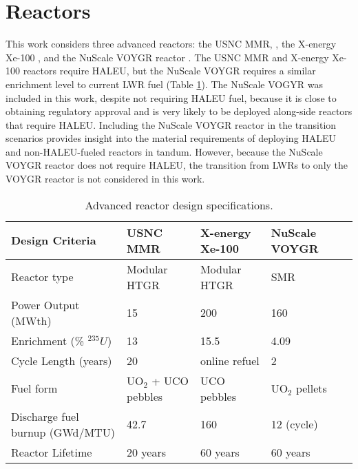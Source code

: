 \section{Reactors} \label{sec:reactor_methods}
This work considers three advanced reactors: the \gls{USNC} \gls{MMR}, 
\cite{mitchell_usnc_2020}, the X-energy Xe-100 
\cite{harlan_x-energy_2018,hussain_advances_2018}, and the NuScale VOYGR reactor
\cite{nuscale_chapter_2020,nuscale_chapter_2020-1}. The \gls{USNC} \gls{MMR}
and X-energy Xe-100 reactors require \gls{HALEU}, but the NuScale VOYGR requires
a similar enrichment level to current \gls{LWR} fuel (Table \ref{tab:reactor_summary}). 
The NuScale VOGYR was included in this work, despite not requiring \gls{HALEU} fuel, 
because it is close to obtaining regulatory approval and is very likely to be 
deployed along-side reactors that require \gls{HALEU}. Including the NuScale 
VOYGR reactor in the transition scenarios provides insight into the material 
requirements of deploying \gls{HALEU} and non-\gls{HALEU}-fueled reactors 
in tandum. However, because the NuScale VOYGR reactor does not require 
\gls{HALEU}, the transition from \glspl{LWR} to only the VOYGR reactor is 
not considered in this work.

\begin{table}[ht]
    \centering
    \caption{Advanced reactor design specifications.}
    \label{tab:reactor_summary}
    \begin{tabular}{l p{3.5cm}p{3cm}p{3cm}p{3cm}}
        \hline
        Design Criteria & \gls{USNC} \gls{MMR} & 
            X-energy Xe-100 & NuScale VOYGR \\\hline
        Reactor type & Modular HTGR & Modular HTGR & SMR\\
        Power Output (MWth) & 15 & 200 & 160\\
        Enrichment (\% $^{235}U$) & 13 & 15.5 & 4.09\\
        Cycle Length (years) & 20 & online refuel & 2\\
        Fuel form & UO$_2$ + UCO pebbles & UCO pebbles & UO$_2$ pellets\\
        Discharge fuel burnup (GWd/MTU) & 42.7& 160 & 12 (cycle) \\
        Reactor Lifetime & 20 years & 60 years & 60 years\\
        \hline
    \end{tabular}
\end{table}

